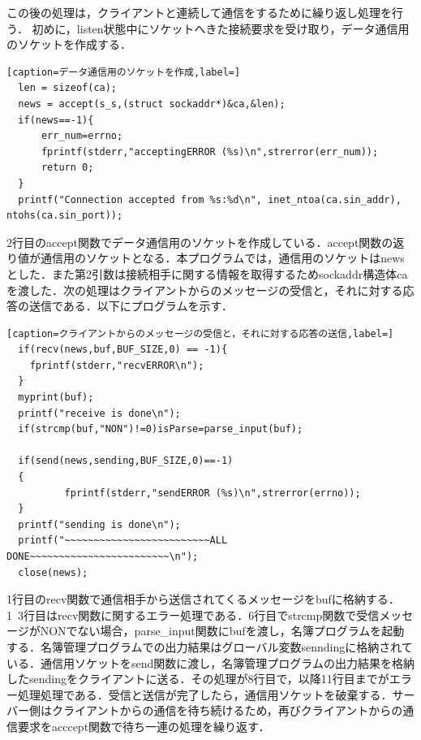 \documentclass[11pt,a4j,titlepage]{jsarticle}
\begin{document}
この後の処理は，クライアントと連続して通信をするために繰り返し処理を行う．
初めに，listen状態中にソケットへきた接続要求を受け取り，データ通信用のソケットを作成する．
\begin{lstlisting}[caption=データ通信用のソケットを作成,label=]
  len = sizeof(ca);
  news = accept(s_s,(struct sockaddr*)&ca,&len);
  if(news==-1){
      err_num=errno;
      fprintf(stderr,"acceptingERROR (%s)\n",strerror(err_num));
      return 0;
  }
  printf("Connection accepted from %s:%d\n", inet_ntoa(ca.sin_addr), ntohs(ca.sin_port));
\end{lstlisting}
2行目のaccept関数でデータ通信用のソケットを作成している．accept関数の返り値が通信用のソケットとなる．本プログラムでは，通信用のソケットはnewsとした．また第2引数は接続相手に関する情報を取得するためsockaddr構造体caを渡した．次の処理はクライアントからのメッセージの受信と，それに対する応答の送信である．以下にプログラムを示す．
\begin{lstlisting}[caption=クライアントからのメッセージの受信と，それに対する応答の送信,label=]
  if(recv(news,buf,BUF_SIZE,0) == -1){
    fprintf(stderr,"recvERROR\n");
  }
  myprint(buf);
  printf("receive is done\n");
  if(strcmp(buf,"NON")!=0)isParse=parse_input(buf);

  if(send(news,sending,BUF_SIZE,0)==-1)
  {
          fprintf(stderr,"sendERROR (%s)\n",strerror(errno));
  }
  printf("sending is done\n");
  printf("~~~~~~~~~~~~~~~~~~~~~~~~~ALL DONE~~~~~~~~~~~~~~~~~~~~~~~~\n");
  close(news);

\end{lstlisting}
1行目のrecv関数で通信相手から送信されてくるメッセージをbufに格納する．1~3行目はrecv関数に関するエラー処理である．6行目でstrcmp関数で受信メッセージがNONでない場合，parse\_input関数にbufを渡し，名簿プログラムを起動する．名簿管理プログラムでの出力結果はグローバル変数senndingに格納されている．通信用ソケットをsend関数に渡し，名簿管理プログラムの出力結果を格納したsendingをクライアントに送る．その処理が8行目で，以降11行目までがエラー処理処理である．受信と送信が完了したら，通信用ソケットを破棄する．サーバー側はクライアントからの通信を待ち続けるため，再びクライアントからの通信要求をacccept関数で待ち一連の処理を繰り返す．
\end{document}
